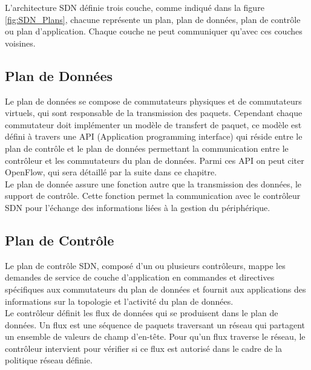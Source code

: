 L’architecture SDN définie trois couche,  comme indiqué dans la figure \ref{fig:SDN_Plans}, chacune représente un plan, plan de données, plan de contrôle ou plan d’application. Chaque couche ne peut communiquer qu’avec ces couches voisines. 

\subsection{Plan de Données}
Le plan de données se compose de commutateurs physiques et de commutateurs virtuels, qui sont responsable de la transmission des paquets. Cependant chaque commutateur doit implémenter un modèle de transfert de paquet, ce modèle est défini à travers une API (Application programming interface) qui réside entre le plan de contrôle et le plan de données permettant la communication entre le contrôleur et les commutateurs du plan de données. Parmi ces API on peut citer OpenFlow, qui sera détaillé par la suite dans ce chapitre.\\

\noindent Le plan de donnée assure une fonction autre que la transmission des données, le support de contrôle. Cette fonction permet la communication avec le contrôleur SDN pour l’échange des informations liées à la gestion du périphérique.  

\subsection{Plan de Contrôle}
Le plan de contrôle SDN, composé d’un ou plusieurs contrôleurs, mappe les demandes de service de couche d’application en commandes et directives spécifiques aux commutateurs du plan de données et fournit aux applications des informations sur la topologie et l’activité du plan de données.\\

\noindent Le contrôleur définit les flux de données qui se produisent dans le plan de données. Un flux est une séquence de paquets traversant un réseau qui partagent un ensemble de valeurs de champ d'en-tête. Pour qu’un flux traverse le réseau, le contrôleur intervient pour vérifier si ce flux est autorisé dans le cadre de la politique réseau définie.\\

